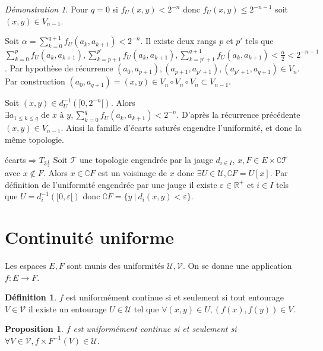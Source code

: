\documentclass[a4paper, 11pt, french]{book}
\newenvironment{itemise}{\itemize}{\enditemize}
\theoremstyle{plain} %
\newtheorem{proposition}{Proposition}
\theoremstyle{definition} %
\newtheorem{definition}{Définition}
\theoremstyle{remark} %
\newtheorem*{demonstration}{Démonstration}
\newcommand{\1}{\mathds{1}}
\newcommand{\infegal}{\leqslant}
\newcommand{\inv}[1]{#1^{-1}}
\newcommand{\R}{\mathbb{R}}
\newcommand\ens[2]{\{#1 \ |\ #2\}}
\begin{document}
\begin{demonstration}
\begin{itemise}
\begin{itemise}
\begin{itemise}
				\item Pour $q=0$ si $f_U(x, y)<2^{-n}$ donc $f_U(x, y)\infegal2^{-n-1}$ soit $(x, y)\in V_{n-1}$.
				\item Soit $\alpha=\sum_{k=0}^{q+1}f_U(a_k, a_{k+1})<2^{-n}$.
				Il existe deux rangs $p$ et $p'$ tels que $\sum_{k=0}^pf_U(a_k, a_{k+1}), \sum_{k=p+1}^{p'}f_U(a_k, a_{k+1}), \sum_{k=p'+1}^{q+1}f_U(a_k, a_{k+1})<\frac{\alpha}{2}<2^{-n-1}$.
				Par hypothèse de récurrence $(a_0, a_{p+1}), (a_{p+1}, a_{p'+1}), (a_{p'+1}, a_{q+1})\in V_n$.
				Par construction $(a_0, a_{q+1})=(x, y)\in V_n\circ V_n\circ V_n\subset V_{n-1}$.
			\end{itemise}
			\item Soit $(x, y)\in\inv{d_U}([0, 2^{-n}[)$.
			Alors $\exists a_{1\infegal k\infegal q}\text{ de }x\text{ à }y, \sum_{k=0}^qf_U(a_k, a_{k+1})<2^{-n}$.
			D'après la récurrence précédente $(x, y)\in V_{n-1}$.
		\end{itemise}
		Ainsi la famille d'écarts saturés engendre l'uniformité, et donc la même topologie.
		\item[écarts$\Rightarrow T_{3\frac{1}{2}}$] Soit $\mathscr{T}$ une topologie engendrée par la jauge $d_{i\in I}$, $x, F\in E\times\complement\mathscr{T}$ avec $x\notin F$.
		Alors $x\in\complement F$ est un voisinage de $x$ donc $\exists U\in\mathscr{U}, \complement F=U[x]$.
		Par définition de l'uniformité engendrée par une jauge il existe $\varepsilon\in\R^+$ et $i\in I$ tels que $U=\inv{d_i}([0, \varepsilon[)$ donc $\complement F=\ens{y}{d_i(x, y)<\varepsilon}$.
	\end{itemise}
\end{demonstration}

\section{Continuité uniforme}

Les espaces $E, F$ sont munis des uniformités $\mathscr{U}, \mathscr{V}$.
On se donne une application $f:E\rightarrow F$.

\begin{definition}
	$f$ est uniformément continue si et seulement si tout entourage $V\in\mathscr{V}$ il existe un entourage $U\in\mathscr{U}$ tel que $\forall (x, y)\in U, (f(x), f(y))\in V$.
\end{definition}

\begin{proposition}
	$f$ est uniformément continue si et seulement si $\forall V\in\mathscr{V}, \inv{f\times F}(V)\in\mathscr{U}$.
\end{proposition}
\end{document}
